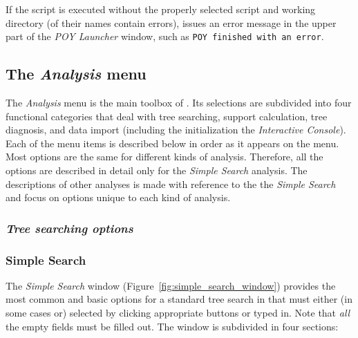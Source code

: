 If the script is executed without the properly selected script and
working directory (of their names contain errors), \poy issues an
error message in the upper part of the \emph{POY Launcher} window,
such as \texttt{POY finished with an error}.

\subsection{The \emph{Analysis} menu}
The \emph{Analysis} menu is the main toolbox of \poy. Its selections are subdivided into four functional categories that deal with tree searching, support calculation, tree diagnosis, and data import (including the initialization the \emph{Interactive Console}). Each of the menu items is described below in order as it
appears on the menu. Most options are the same for different kinds of analysis. Therefore, all the options are described in detail only for the \emph{Simple Search} analysis. The descriptions of other analyses is made with reference to the the \emph{Simple Search} and focus on options unique to each kind of analysis.

\subsubsection{\emph{Tree searching options}}

\subsubsection{Simple Search}
The \emph{Simple Search} window (Figure~\ref{fig:simple_search_window})
provides the most common and basic options for a standard tree search
in \poy that must either (in some cases or) selected by clicking appropriate buttons or typed in. Note that \emph{all} the empty fields must be filled out. The window is subdivided in four sections: 

